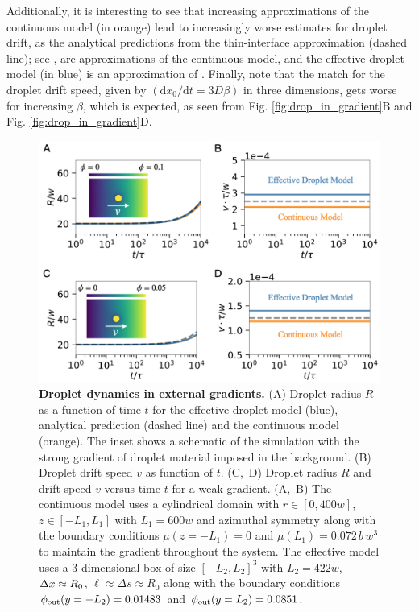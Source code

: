 Additionally, it is interesting to see that increasing approximations of the continuous model (in orange) lead to increasingly worse estimates for droplet drift, as the analytical predictions from the thin-interface approximation (dashed line); see , are approximations of the continuous model, and the effective droplet model (in blue) is an approximation of .
Finally, note that the match for the droplet drift speed, given by $(\mathrm{d} x_0 / \mathrm{d} t = 3 D \beta)$ in three dimensions, gets worse for increasing $\beta$, which is expected, as seen from Fig. \ref{fig:drop_in_gradient}B and Fig. \ref{fig:drop_in_gradient}D.

\clearpage

\begin{figure}[tb]
\centering
\includegraphics[scale=0.5]{MainContent/Figures/drop_in_gradient.pdf}
\caption{
\textbf{Droplet dynamics in external gradients.}
(A) Droplet radius $R$ as a function of time $t$ for the effective droplet model (blue), analytical prediction (dashed line) and the continuous model (orange).
The inset shows a schematic of the simulation with the strong gradient of droplet material imposed in the background.
(B) Droplet drift speed $v$ as function of $t$.
\mbox{(C, D)} Droplet radius $R$ and drift speed $v$ versus time $t$ for a weak gradient. 
\mbox{(A, B)}
The continuous model uses a cylindrical domain with $r \in [0, 400 w]$, $z\in [-L_1, L_1]$ with $L_1=600 w$ and azimuthal symmetry along with the boundary conditions $\mu(z=-L_1) = 0$ and $\mu(L_1)= 0.072\,b\,w^3$ to maintain the gradient throughout the system.
The effective model uses a $3$-dimensional box of size $[-L_2, L_2]^3$ with $L_2 = 422 w$, $\Delta x \approx R_0$, $\ell \approx \Delta s \approx R_0$ along with the boundary conditions $\phi_\mathrm{out}(y = -L_2) = 0.01483$ and $\phi_\mathrm{out}(y = L_2) = 0.0851$.
}
\end{figure}
